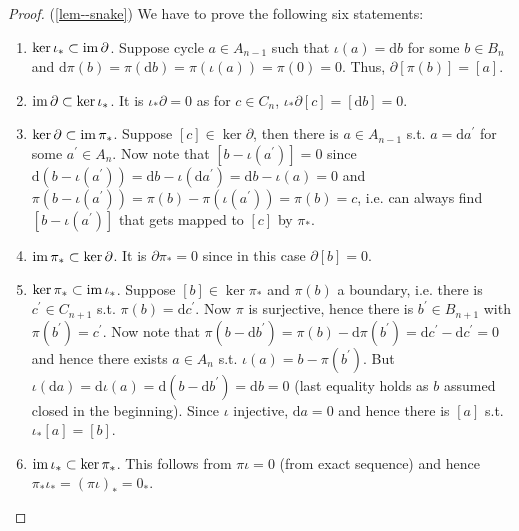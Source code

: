 \documentclass[a4paper,11pt]{article}
\begin{document}
				\begin{proof}(\autoref{lem--snake})
					We have to prove the following six statements:
					\begin{enumerate}
						\item $\ker\iota_\ast\subset\operatorname{im} \partial$. Suppose cycle $a\in A_{n-1}$ such that $\iota(a)=\mathrm{d}b$ for some $b\in B_n$ and $\mathrm{d}\pi(b)=\pi(\mathrm{d}b)=\pi(\iota(a))=\pi(0)=0$. Thus, $\partial[\pi(b)]=[a]$.
						
						\item $\operatorname{im} \partial\subset\ker\iota_\ast$. It is $\iota_\ast \partial=0$ as for $c\in C_n$, $\iota_\ast \partial[c]=[\mathrm{d}b]=0$.
						
						\item $\ker\partial\subset\operatorname{im}\pi_\ast$. Suppose $[c]\in \ker\partial$, then there is $a\in A_{n-1}$ s.t. $a=\mathrm{d}a^{\prime}$ for some $a^{\prime}\in A_n$. Now note that $[b-\iota(a^{\prime})]=0$ since $\mathrm{d}(b-\iota(a^{\prime}))=\mathrm{d}b-\iota(\mathrm{d}a^{\prime})=\mathrm{d}b-\iota(a)=0$ and $\pi(b-\iota(a^{\prime}))=\pi(b)-\pi(\iota(a^{\prime}))=\pi(b)=c$, i.e. can always find $[b-\iota(a^{\prime})]$ that gets mapped to $[c]$ by $\pi_\ast$.
						
						\item $\operatorname{im}\pi_\ast\subset\ker\partial$. It is $\partial\pi_\ast=0$ since in this case $\partial[b]=0$.
						
						\item $\ker\pi_\ast\subset\operatorname{im}\iota_\ast$. Suppose $[b]\in\ker\pi_\ast$ and $\pi(b)$ a boundary, i.e. there is $c^{\prime}\in C_{n+1}$ s.t. $\pi(b)=\mathrm{d}c^{\prime}$. Now $\pi$ is surjective, hence there is $b^{\prime}\in B_{n+1}$ with $\pi(b^{\prime})=c^{\prime}$. Now note that $\pi(b-\mathrm{d}b^{\prime})=\pi(b)-\mathrm{d}\pi(b^{\prime})=\mathrm{d}c^{\prime}-\mathrm{d}c^{\prime}=0$ and hence there exists $a\in A_n$ s.t. $\iota(a)=b-\pi(b^{\prime})$. But $\iota(\mathrm{d}a)=\mathrm{d}\iota(a)=\mathrm{d}(b-\mathrm{d}b^{\prime})=\mathrm{d}b=0$ (last equality holds as $b$ assumed closed in the beginning). Since $\iota$ injective, $\mathrm{d}a=0$ and hence there is $[a]$ s.t. $\iota_\ast[a]=[b]$.
						
						\item $\operatorname{im}\iota_\ast\subset\ker\pi_\ast$. This follows from $\pi\iota=0$ (from exact sequence) and hence $\pi_\ast\iota_\ast=(\pi\iota)_\ast=0_\ast$.
					\end{enumerate}
				\end{proof}
\end{document}

